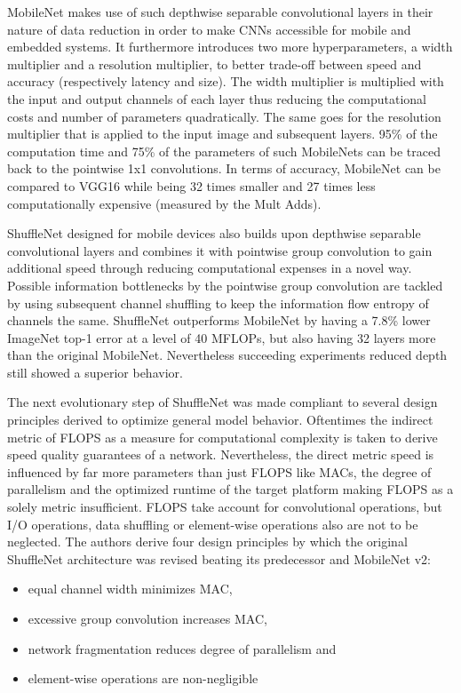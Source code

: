 MobileNet makes use of such depthwise separable convolutional layers in their nature of data reduction in order to make CNNs accessible for mobile and embedded systems. It furthermore introduces two more hyperparameters, a width multiplier and a resolution multiplier, to better trade-off between speed and accuracy (respectively latency and size). The width multiplier is multiplied with the input and output channels of each layer thus reducing the computational costs and number of parameters quadratically. The same goes for the resolution multiplier that is applied to the input image and subsequent layers. 95\% of the computation time and 75\% of the parameters of such MobileNets can be traced back to the pointwise 1x1 convolutions. In terms of accuracy, MobileNet can be compared to VGG16 while being 32 times smaller and 27 times less computationally expensive (measured by the Mult Adds). \cite{AndrewGHoward.2017}

ShuffleNet designed for mobile devices also builds upon depthwise separable convolutional layers and combines it with pointwise group convolution to gain additional speed through reducing computational expenses in a novel way. Possible information bottlenecks by the pointwise group convolution are tackled by using subsequent channel shuffling to keep the information flow entropy of channels the same. ShuffleNet outperforms MobileNet by having a 7.8\% lower ImageNet \cite{JiaDeng.2009} top-1 error at a level of 40 MFLOPs, but also having 32 layers more than the original MobileNet. Nevertheless succeeding experiments reduced depth still showed a superior behavior. \cite{XiangyuZhang.2017}

The next evolutionary step of ShuffleNet was made compliant to several design principles derived to optimize general model behavior. Oftentimes the indirect metric of FLOPS as a measure for computational complexity is taken to derive speed quality guarantees of a network. Nevertheless, the direct metric speed is influenced by far more parameters than just FLOPS like MACs, the degree of parallelism and the optimized runtime of the target platform making FLOPS as a solely metric insufficient. FLOPS take account for convolutional operations, but I/O operations, data shuffling or element-wise operations also are not to be neglected. The authors derive four design principles by which the original ShuffleNet architecture was revised beating its predecessor and MobileNet v2: \cite{NingningMa.2018}

\begin{itemize}
	\item equal channel width minimizes MAC, 
	\item excessive group convolution increases MAC, 
	\item network fragmentation reduces degree of parallelism and
	\item element-wise operations are non-negligible
\end{itemize}

